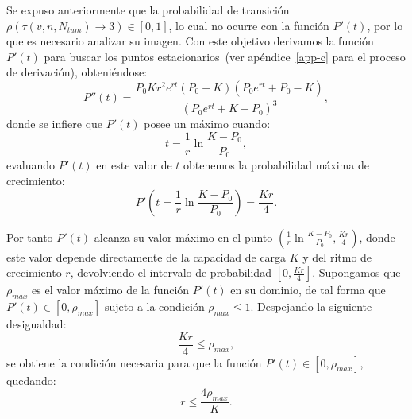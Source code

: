 Se expuso anteriormente que la probabilidad de transici\'on $\rho(\tau(v,n,N_{tum}) \rightarrow 3) \in [0,1]$, lo cual no ocurre con la funci\'on $P'(t)$, por lo que es necesario analizar su imagen. Con este objetivo derivamos la funci\'on $P'(t)$ para buscar los puntos estacionarios~(ver ap\'endice~\ref{app-c} para el proceso de derivaci\'on), obteni\'endose: 
\begin{equation}
P''(t) = \frac{P_0 K r^2 e^{rt} (P_0-K)(P_0 e^{rt} + P_0 - K)}{(P_0 e^{rt} + K - P_0)^3},
\end{equation}
donde se infiere que $P'(t)$ posee un m\'aximo cuando:
\begin{equation}
t = \frac{1}{r} \ln\frac{K-P_0}{P_0}, \label{eq-cond-t}
\end{equation}
evaluando $P'(t)$ en este valor de $t$ obtenemos la probabilidad m\'axima de crecimiento:
\begin{equation}
P'\left(t = \frac{1}{r} \ln\frac{K-P_0}{P_0}\right) = \frac{Kr}{4}.
\end{equation}

Por tanto $P'(t)$ alcanza su valor m\'aximo en el punto $(\frac{1}{r} \ln\frac{K-P_0}{P_0}, \frac{Kr}{4})$, donde este valor depende directamente de la capacidad de carga $K$ y del ritmo de crecimiento $r$, devolviendo el intervalo de probabilidad $[0, \frac{Kr}{4}]$. Supongamos que $\rho_{max}$ es el valor m\'aximo de la funci\'on $P'(t)$ en su dominio, de tal forma que $P'(t) \in [0, \rho_{max}]$ sujeto a la condici\'on $\rho_{max} \leq 1$. Despejando la siguiente desigualdad:
\begin{equation}
\frac{K r}{4} \leq \rho_{max},
\end{equation}
se obtiene la condici\'on necesaria para que la funci\'on $P'(t) \in [0,\rho_{max}]$, quedando:
\begin{equation}
r \leq \frac{4 \rho_{max}}{K}. \label{eq-cond-1}
\end{equation}

